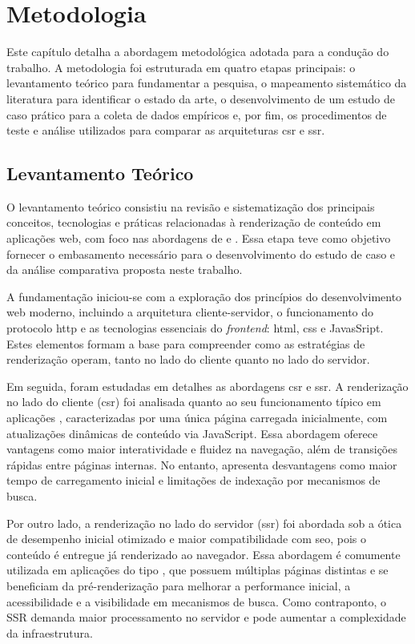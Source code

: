 \chapter{Metodologia}
\label{cap:metodologia}

Este capítulo detalha a abordagem metodológica adotada para a condução do trabalho. A metodologia foi estruturada em quatro etapas principais: o levantamento teórico para fundamentar a pesquisa, o mapeamento sistemático da literatura para identificar o estado da arte, o desenvolvimento de um estudo de caso prático para a coleta de dados empíricos e, por fim, os procedimentos de teste e análise utilizados para comparar as arquiteturas \acrshort{csr} e \acrshort{ssr}.


\section{Levantamento Teórico}
\label{sec:levantamento-teorico}

O levantamento teórico consistiu na revisão e sistematização dos principais conceitos, tecnologias e práticas relacionadas à renderização de conteúdo em aplicações web, com foco nas abordagens de  e . Essa etapa teve como objetivo fornecer o embasamento necessário para o desenvolvimento do estudo de caso e da análise comparativa proposta neste trabalho.

A fundamentação iniciou-se com a exploração dos princípios do desenvolvimento web moderno, incluindo a arquitetura cliente-servidor, o funcionamento do protocolo \acrshort{http} e as tecnologias essenciais do \textit{frontend}: \acrshort{html}, \acrshort{css} e JavasSript. Estes elementos formam a base para compreender como as estratégias de renderização operam, tanto no lado do cliente quanto no lado do servidor.

Em seguida, foram estudadas em detalhes as abordagens \acrshort{csr} e \acrshort{ssr}. A renderização no lado do cliente (\acrshort{csr}) foi analisada quanto ao seu funcionamento típico em aplicações , caracterizadas por uma única página carregada inicialmente, com atualizações dinâmicas de conteúdo via JavaScript. Essa abordagem oferece vantagens como maior interatividade e fluidez na navegação, além de transições rápidas entre páginas internas. No entanto, apresenta desvantagens como maior tempo de carregamento inicial e limitações de indexação por mecanismos de busca.

Por outro lado, a renderização no lado do servidor (\acrshort{ssr}) foi abordada sob a ótica de desempenho inicial otimizado e maior compatibilidade com \acrshort{seo}, pois o conteúdo é entregue já renderizado ao navegador. Essa abordagem é comumente utilizada em aplicações do tipo , que possuem múltiplas páginas distintas e se beneficiam da pré-renderização para melhorar a performance inicial, a acessibilidade e a visibilidade em mecanismos de busca. Como contraponto, o SSR demanda maior processamento no servidor e pode aumentar a complexidade da infraestrutura.


